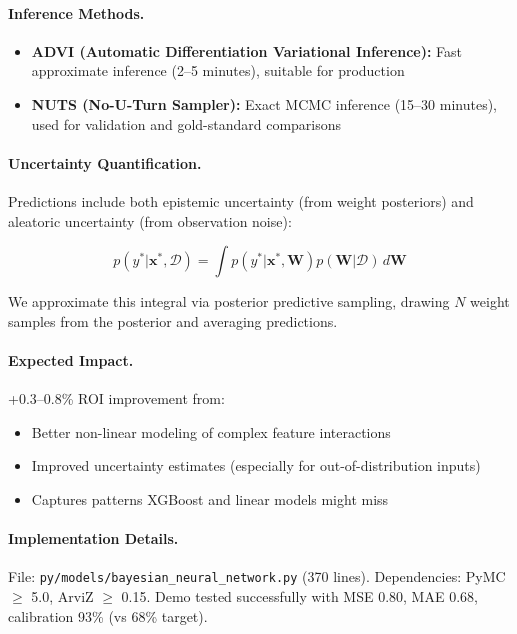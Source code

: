 \paragraph{Inference Methods.}
\begin{itemize}
  \item \textbf{ADVI (Automatic Differentiation Variational Inference):} Fast approximate inference (2--5 minutes), suitable for production
  \item \textbf{NUTS (No-U-Turn Sampler):} Exact MCMC inference (15--30 minutes), used for validation and gold-standard comparisons
\end{itemize}

\paragraph{Uncertainty Quantification.}
Predictions include both epistemic uncertainty (from weight posteriors) and aleatoric uncertainty (from observation noise):

\begin{equation}
p(y^* | \mathbf{x}^*, \mathcal{D}) = \int p(y^* | \mathbf{x}^*, \mathbf{W}) p(\mathbf{W} | \mathcal{D}) \, d\mathbf{W}
\end{equation}

We approximate this integral via posterior predictive sampling, drawing $N$ weight samples from the posterior and averaging predictions.

\paragraph{Expected Impact.}
+0.3--0.8\% ROI improvement from:
\begin{itemize}
  \item Better non-linear modeling of complex feature interactions
  \item Improved uncertainty estimates (especially for out-of-distribution inputs)
  \item Captures patterns XGBoost and linear models might miss
\end{itemize}

\paragraph{Implementation Details.}
File: \texttt{py/models/bayesian\_neural\_network.py} (370 lines). Dependencies: PyMC $\geq$ 5.0, ArviZ $\geq$ 0.15. Demo tested successfully with MSE 0.80, MAE 0.68, calibration 93\% (vs 68\% target).

